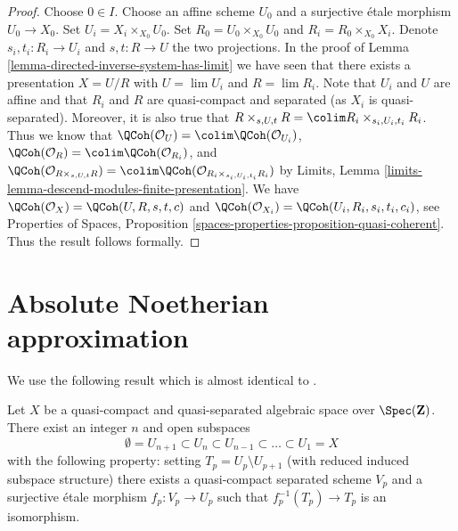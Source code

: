 \begin{proof}
Choose $0 \in I$. Choose an affine scheme $U_0$ and a surjective
\'etale morphism $U_0 \to X_0$. Set $U_i = X_i \times_{X_0} U_0$.
Set $R_0 = U_0 \times_{X_0} U_0$ and $R_i = R_0 \times_{X_0} X_i$.
Denote $s_i, t_i : R_i \to U_i$ and $s, t : R \to U$ the two
projections. In the proof of
Lemma \ref{lemma-directed-inverse-system-has-limit} we have
seen that there exists a presentation $X = U/R$ with
$U = \lim U_i$ and $R = \lim R_i$. Note that $U_i$ and $U$ are affine and
that $R_i$ and $R$ are quasi-compact and separated (as $X_i$ is
quasi-separated). Moreover, it is also true that
$R \times_{s, U, t} R = \colim R_i \times_{s_i, U_i, t_i} R_i$.
Thus we know that
$\QCoh(\mathcal{O}_U) = \colim \QCoh(\mathcal{O}_{U_i})$,
$\QCoh(\mathcal{O}_R) = \colim \QCoh(\mathcal{O}_{R_i})$,
and
$\QCoh(\mathcal{O}_{R \times_{s, U, t} R}) =
\colim \QCoh(\mathcal{O}_{R_i \times_{s_i, U_i, t_i} R_i})$ by
Limits, Lemma \ref{limits-lemma-descend-modules-finite-presentation}.
We have $\QCoh(\mathcal{O}_X) = \QCoh(U, R, s, t, c)$ and
$\QCoh(\mathcal{O}_{X_i}) = \QCoh(U_i, R_i, s_i, t_i, c_i)$,
see Properties of Spaces, Proposition
\ref{spaces-properties-proposition-quasi-coherent}.
Thus the result follows formally.
\end{proof}














\section{Absolute Noetherian approximation}
\label{section-approximation}

\noindent
We use the following result which is almost identical to
\cite[Proposition 5.7.8]{GruRay}.

\begin{lemma}
\label{lemma-filter-quasi-compact-quasi-separated}
Let $X$ be a quasi-compact and quasi-separated algebraic space over
$\Spec(\mathbf{Z})$. There exist an integer $n$ and open subspaces
$$
\emptyset = U_{n + 1} \subset
U_n \subset U_{n - 1} \subset \ldots \subset U_1 = X
$$
with the following property: setting $T_p = U_p \setminus U_{p + 1}$
(with reduced induced subspace structure) there exists a quasi-compact
separated scheme $V_p$ and a surjective \'etale morphism $f_p : V_p \to U_p$
such that $f_p^{-1}(T_p) \to T_p$ is an isomorphism.
\end{lemma}

